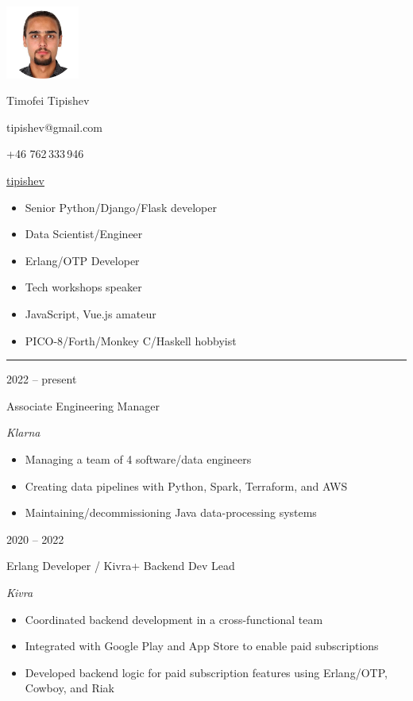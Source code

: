\documentclass[a4paper,10pt]{article}
\newlength{\cvcolumngapwidth}
\newlength{\cvleftcolumnwidth}
\newlength{\cvrightcolumnwidth}
\newcommand{\cvnamestyle}[1]{{\Large\cvnamefont\textcolor{cvnamecolor}{#1}}}
\newcommand{\cvsectionstyle}[1]{{\normalsize\cvsectionfont\textcolor{cvsectioncolor}{#1}}}
\newcommand{\employer}[1]{{\itshape #1}}
\newcommand{\cvtitlestyle}[1]{{\large\cvtitlefont\textcolor{cvtitlecolor}{#1}}}
\newcommand{\cvdurationstyle}[1]{{\small\cvdurationfont\textcolor{cvdurationcolor}{#1}}}
\newlength{\cvafteritemskipamount}
\newlength{\cvaftersectionskipamount}
\newlength{\cvafternameskipamount}
\newlength{\cvafterpersonalinfolineskipamount}
\newlength{\cvaftertitleskipamount}
\newlength{\cvparskip}
\newcommand{\cvpersonalinfo}[3]{
    \begin{minipage}[t]{\cvleftcolumnwidth}
        \vspace{0mm} %
        \raggedleft #1
    \end{minipage}%
    \hspace{\cvcolumngapwidth}%
    \begin{minipage}[t]{60mm}
        \vspace{0mm} %
        #2
    \end{minipage}
    \begin{minipage}[t]{70mm}
        \vspace{0mm} %
	#3
    \end{minipage}

    \vspace{\cvafteritemskipamount}
}
\newcommand{\cvname}[1]{
    \cvnamestyle{#1}

    \vspace{\cvafternameskipamount}
}
\newcommand{\cvpersonalinfolinewithicon}[3]{
    \raisebox{.5\fontcharht\font`E-.5\height}{\texttt{[image: \#2]}}
    #3

    \vspace{\cvafterpersonalinfolineskipamount}
}
\newcommand{\cvsection}[1]{
    \begin{minipage}[t]{\cvleftcolumnwidth}
        \raggedleft\cvsectionstyle{#1}
    \end{minipage}%
    \hspace{\cvcolumngapwidth}%
    \begin{minipage}[t]{\cvrightcolumnwidth}
        \textcolor{cvrulecolor}{\rule{\cvrightcolumnwidth}{0.3mm}}
    \end{minipage}

    \vspace{\cvaftersectionskipamount}
}
\newcommand{\cvitem}[2]{
    \begin{minipage}[t]{\cvleftcolumnwidth}
        \raggedleft #1
    \end{minipage}%
    \hspace{\cvcolumngapwidth}%
    \begin{minipage}[t]{\cvrightcolumnwidth}
        \setlength{\parskip}{\cvparskip} #2
    \end{minipage}

    \vspace{\cvafteritemskipamount}
}
\newcommand{\cvtitle}[1]{
    \cvtitlestyle{#1}

    \vspace{\cvaftertitleskipamount}
    \vspace{-\cvparskip}
}
\begin{document}

\cvpersonalinfo{
    \includegraphics[height=24mm]{me-circle.png}

}{
    \cvname{Timofei Tipishev}

    \cvpersonalinfolinewithicon{height=4mm}{070-envelop.pdf}{
        tipishev@gmail.com
    }


    \cvpersonalinfolinewithicon{height=4mm}{067-phone.pdf}{
        +46 762\,333\,946
    }

    \cvpersonalinfolinewithicon{height=4mm}{github.png}{
	    \href{https://github.com/tipishev}{tipishev}
    }
}{
	\begin{itemize}[leftmargin=*]
		\item Senior Python/Django/Flask developer
		\item Data Scientist/Engineer
		\item Erlang/OTP Developer
		\item Tech workshops speaker
		\item JavaScript, Vue.js amateur
		\item PICO-8/Forth/Monkey C/Haskell hobbyist
	\end{itemize}
}



\cvsection{WORK EXPERIENCE}

\cvitem{
    \cvdurationstyle{2022 -- present}
}{
    \cvtitle{Associate Engineering Manager}

    \employer{Klarna}

    \begin{itemize}[leftmargin=*]
       \item Managing a team of 4 software/data engineers
       \item Creating data pipelines with Python, Spark, Terraform, and AWS
       \item Maintaining/decommissioning Java data-processing systems
    \end{itemize}
}

\cvitem{
    \cvdurationstyle{2020 -- 2022}
}{
    \cvtitle{Erlang Developer / Kivra+ Backend Dev Lead}

    \employer{Kivra}

    \begin{itemize}[leftmargin=*]
       \item Coordinated backend development in a cross-functional team
       \item Integrated with Google Play and App Store to enable paid subscriptions
       \item Developed backend logic for paid subscription features using Erlang/OTP, Cowboy, and Riak
    \end{itemize}
}
\end{document}
